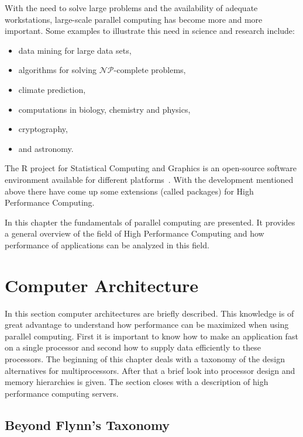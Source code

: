 With the need to solve large problems and the availability of adequate
workstations, large-scale parallel computing has become more and more
important. Some examples to illustrate this need in science and
research include:
\begin{itemize}
\item data mining for large data sets,
\item algorithms for solving $\mathcal{NP}$-complete problems,
\item climate prediction,
\item computations in biology, chemistry and physics,
\item cryptography,
\item and astronomy.
\end{itemize}

The R project for Statistical Computing and Graphics is an open-source
software environment available for different
platforms~\cite{Rcore07R}. With the 
development mentioned above there have come up some extensions (called
packages) for High Performance Computing.

In this chapter the fundamentals of parallel computing are
presented. It provides a general overview of the field of High
Performance Computing and how performance of applications can be
analyzed in this field.

\section{Computer Architecture}
In this section computer architectures are briefly described. This
knowledge is of great advantage to
understand how performance can be maximized when using parallel
computing. First it is important to know how to make an application fast
on a single processor and second how to supply data efficiently to
these processors. The beginning of this chapter deals with a taxonomy of
the design alternatives for multiprocessors. After that a brief look
into processor design and memory hierarchies is given. The section
closes with a description of high performance computing servers.

\subsection{Beyond Flynn's Taxonomy}

